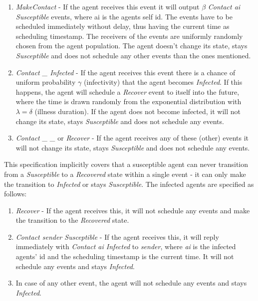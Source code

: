 \begin{enumerate}
	\item \textit{MakeContact} - If the agent receives this event it will output $\beta$  \textit{Contact ai Susceptible} events, where ai is the agents self id. The events have to be scheduled immediately without delay, thus having the current time as scheduling timestamp. The receivers of the events are uniformly randomly chosen from the agent population. The agent doesn't change its state, stays \textit{Susceptible} and does not schedule any other events than the ones mentioned.
	
	\item \textit{Contact \_ Infected} - If the agent receives this event there is a chance of uniform probability $\gamma$ (infectivity) that the agent becomes \textit{Infected}. If this happens, the agent will schedule a \textit{Recover} event to itself into the future, where the time is drawn randomly from the exponential distribution with $\lambda = \delta$ (illness duration). If the agent does not become infected, it will not change its state, stays \textit{Susceptible} and does not schedule any events.
	
	\item \textit{Contact \_ \_} or \textit{Recover} - If the agent receives any of these (other) events it will not change its state, stays \textit{Susceptible} and does not schedule any events.
\end{enumerate}

This specification implicitly covers that a susceptible agent can never transition from a \textit{Susceptible} to a \textit{Recovered} state within a single event - it can only make the transition to \textit{Infected} or stays \textit{Susceptible}. The infected agents are specified as follows:

\begin{enumerate}
	\item \textit{Recover} - If the agent receives this, it will not schedule any events and make the transition to the \textit{Recovered} state.
	
	\item \textit{Contact sender Susceptible} - If the agent receives this, it will reply immediately with \textit{Contact ai Infected} to \textit{sender}, where \textit{ai} is the infected agents' id and the scheduling timestamp is the current time. It will not schedule any events and stays \textit{Infected}.
	
	\item In case of any other event, the agent will not schedule any events and stays \textit{Infected}.
\end{enumerate}

